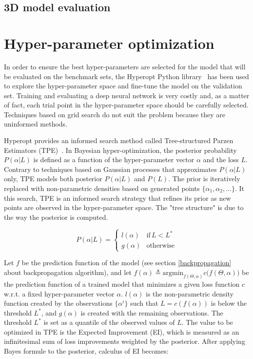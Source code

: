    \subsection{3D model evaluation}


\section{Hyper-parameter optimization}

  In order to ensure the best hyper-parameters are selected for the model that will be evaluated
  on the benchmark sets, the Hyperopt Python library~\cite{Bergstra_2015} has been used to explore
  the hyper-parameter space and fine-tune the model on the validation set.
  Training and evaluating a deep neural network is very costly and, as a matter of fact,
  each trial point in the hyper-parameter space should be carefully selected. Techniques based
  on grid search do not suit the problem because they are uninformed methods.

  Hyperopt provides an informed search method called Tree-structured Parzen Estimators (TPE)~\cite{bergstra2011algorithms}.
  In Bayesian hyper-optimization, the posterior probability $P(\alpha \vert L)$ is defined as a function
  of the hyper-parameter vector $\alpha$ and the loss $L$. Contrary to techniques based on Gaussian processes
  that approximates $P(\alpha \vert L)$ only, TPE models both posterior $P(\alpha \vert L)$ and $P(L)$.
  The prior is iteratively replaced with non-parametric densities based on generated points $\{ \alpha_1, \alpha_2, \dotsc \}$.
  It this search, TPE is an informed search strategy that refines its prior as new points are observed in the
  hyper-parameter space. The "tree structure" is due to the way the posterior is computed.

  \begin{equation}
    P(\alpha \vert L) =
      \begin{cases}
        l(\alpha) &  \text{if} \, L < L^* \\
        g(\alpha) &  \text{otherwise}
      \end{cases}
  \end{equation}

  Let $f$ be the prediction function of the model (see section \ref{backpropagation} about backpropagation algorithm),
  and let $f(\alpha) \triangleq \text{argmin}_{f(\Theta, \alpha)} c\big(f(\Theta, \alpha)\big)$ be the prediction function
  of a trained model that minimizes a given loss function $c$ w.r.t. a fixed hyper-parameter vector $\alpha$.
  $l(\alpha)$ is the non-parametric density function created by the observations $\{ \alpha^{i} \}$ such that
  $L = c(f(\alpha))$ is below the threshold $L^*$, and $g(\alpha)$ is created with the remaining observations.
  The threshold $L^*$ is set as a quantile of the observed values of $L$.
  The value to be optimized in TPE is the Expected Improvement (EI), which is measured as an infinitesimal sum
  of loss improvements weighted by the posterior. After applying Bayes formule to the posterior, calculus of EI becomes:

